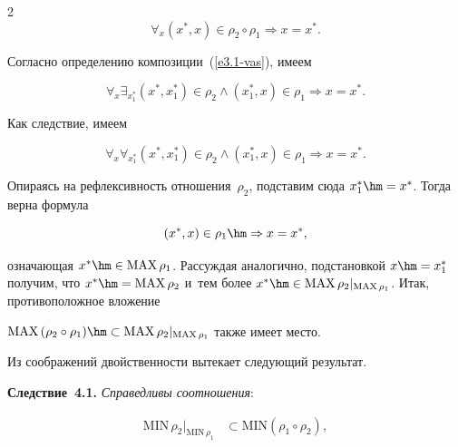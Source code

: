 \begin{multicols}{2}
    $$

    \forall_x \left( x^*,x\right) \in \rho_2\circ\rho_1 \Rightarrow x=x^*.

    $$

     Согласно определению композиции~(\ref{e3.1-vas}), имеем 

    $$

    \forall_x \exists_{x_1^*} \left( x^*, x_1^*\right) \in \rho_2\wedge \left( x_1^*, 

x\right) \in\rho_1\Rightarrow x=x^*.

    $$

     Как следствие, имеем

    $$

    \forall_x \forall_{x_1^*} \left( x^*, x_1^*\right) \in\rho_2\wedge \left( x_1^*, 

x\right) \in\rho_1\Rightarrow x=x^*.

    $$

Опираясь на реф\-лек\-сив\-ность отношения~$\rho_2$, под\-ста\-вим сюда $x_1^*\hm= 

x^*$. Тогда вер\-на формула 

$$

\left( x^*,x\right)\in\rho_1\hm\Rightarrow x= x^*,

$$ 

озна\-ча\-ющая $x^*\hm\in \mathrm{MAX}\,\rho_1$. Рас\-суж\-дая аналогично, под\-ста\-нов\-кой $x\hm= 

x_1^*$ получим, что $x^*\hm= \mathrm{MAX}\,\rho_2$ и~тем более $x^*\hm\in \mathrm{MAX}\,\rho_2\vert_{\mathrm{MAX}\,\rho_1}$. Итак, противоположное вложение 

$\mathrm{MAX}\,(\rho_2\circ\rho_1)\hm\subset \mathrm{MAX}\,\rho_2\vert_{\mathrm{MAX}\,\rho_1}$ так\-же имеет место. 

    

    Из соображений двой\-ст\-вен\-ности вытекает сле\-ду\-ющий результат.

    

    \smallskip

    

    \noindent

    \textbf{Следствие~4.1.} \textit{Справедливы соотношения}:

    \begin{equation}

    \left.

    \begin{array}{rl}

   \mathrm{MIN}\,\rho_2\vert_{\mathrm{MIN}\,\rho_1} &\subset \mathrm{MIN}\left( \rho_1\circ\rho_2\right),\\[6pt]


\end{array}
\end{equation}
\end{multicols}
